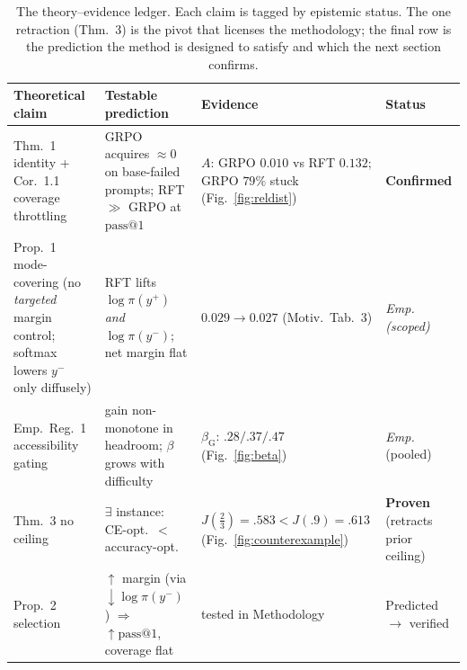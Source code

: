 \begin{table}[htbp]
\centering
\caption{The theory--evidence ledger. Each claim is tagged by epistemic status.
The one retraction (Thm.~3) is the pivot that licenses the methodology; the final
row is the prediction the method is designed to satisfy and which the next section
confirms.}
\label{tab:ledger}
\begin{tabular}{p{4.0cm}p{4.3cm}p{3.1cm}p{2.0cm}}
\toprule
Theoretical claim & Testable prediction & Evidence & Status \\
\midrule
Thm.~1 identity + Cor.~1.1 coverage throttling &
GRPO acquires $\approx\!0$ on base-failed prompts; RFT $\gg$ GRPO at $\text{pass}@1$ &
$A$: GRPO $0.010$ vs RFT $0.132$; GRPO $79\%$ stuck (Fig.~\ref{fig:reldist}) &
\textbf{Confirmed} \\
Prop.~1 mode-covering (no \emph{targeted} margin control; softmax lowers $y^-$ only diffusely) &
RFT lifts $\log\pi(y^{+})$ \emph{and} $\log\pi(y^{-})$; net margin flat &
$0.029\!\to\!0.027$ (Motiv.\ Tab.~3) &
\emph{Emp. (scoped)} \\
Emp.~Reg.~1 accessibility gating &
gain non-monotone in headroom; $\beta$ grows with difficulty &
$\beta_{\text{G}}{:}\,.28/.37/.47$ (Fig.~\ref{fig:beta}) &
\emph{Emp.} (pooled) \\
Thm.~3 no ceiling &
$\exists$ instance: CE-opt.\ $<$ accuracy-opt.\ &
$J(\tfrac23){=}.583 < J(.9){=}.613$ (Fig.~\ref{fig:counterexample}) &
\textbf{Proven} (retracts prior ceiling) \\
Prop.~2 selection &
$\uparrow$ margin (via $\downarrow\log\pi(y^{-})$) $\Rightarrow$ $\uparrow\text{pass}@1$, coverage flat &
tested in Methodology &
Predicted $\rightarrow$ verified \\
\bottomrule
\end{tabular}
\end{table}

